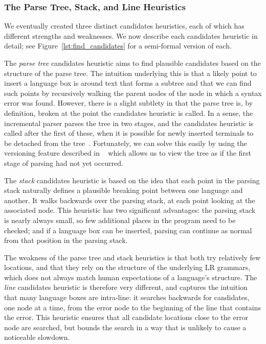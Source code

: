 \documentclass[sigplan,screen]{acmart}
\begin{document}
\subsubsection{The Parse Tree, Stack, and Line Heuristics}

We eventually created three distinct candidates heuristics, each of which has
different strengths and weaknesses. We now describe each candidates heuristic
in detail; see Figure~\ref{lst:find_candidates} for a semi-formal version of
each.

The \emph{parse tree} candidates heuristic aims to
find plausible candidates based on the structure of the parse tree. The
intuition underlying this is that a likely point to insert a language box is
around text that forms a subtree and that we can find such points by
recursively walking the parent nodes of the node in which a syntax error was
found. However, there is a slight subtlety in that the parse tree is, by
definition, broken at the point the candidates heuristic is called. In a sense,
the incremental parser parses the tree in two stages, and the candidates
heuristic is called after the first of these, when it is possible for newly
inserted terminals to be detached from the tree~\cite[p.~58, 60]{wagner98practicalalgorithms}. Fortunately, we can solve this
easily by using the versioning feature described in ~\citet[p.~15]{wagner98practicalalgorithms}
which allows
us to view the tree as if the first stage of parsing had not yet occurred.

The \emph{stack} candidates heuristic is based on
the idea that each point in the parsing stack naturally defines a plausible
breaking point between one language and another. It walks backwards over the
parsing stack, at each point looking at the associated node. This heuristic has
two significant
advantages: the parsing stack is nearly always small, so few additional
places in the program need to be checked; and if a language box can be
inserted, parsing can continue as normal from that position in the parsing
stack.

The weakness of the parse tree and stack heuristics is that both try relatively
few locations, and that they rely on the structure of the underlying LR
grammars, which does not always match human expectations of a language's
structure. The \emph{line} candidates heuristic is therefore very different,
and captures the intuition that many language
boxes are intra-line: it searches
backwards for candidates, one node at a time, from the error node to the beginning of the line
that contains the error. This heuristic
ensures that all
candidate locations close to the error node are searched, but bounds the search
in a way that is unlikely to cause a noticeable slowdown.
\end{document}
